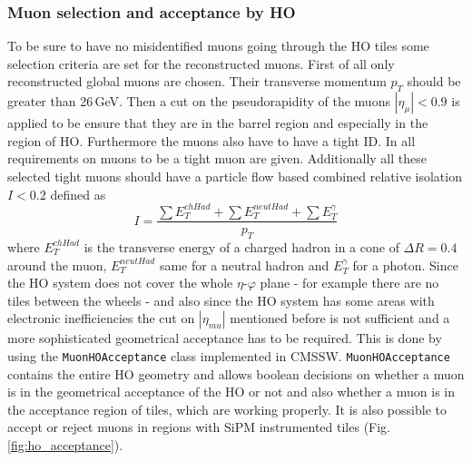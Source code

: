 		\subsubsection{Muon selection and acceptance by HO}
		\label{thesectionhere}
			To be sure to have no misidentified muons going through the HO tiles some selection criteria are set for the reconstructed muons.
			First of all only reconstructed global muons are chosen.
			Their transverse momentum $p_T$ should be greater than 26\,GeV.
			Then a cut on the pseudorapidity of the muons $|\eta_\mu| < 0.9$ is applied to be ensure that they are in the barrel region and especially in the region of HO.
			Furthermore the muons also have to have a tight ID.
			In \cite{CMS-PAPER-MUO-10-004} all requirements on muons to be a tight muon are given.
			Additionally all these selected tight muons should have a particle flow based combined relative isolation $I<0.2$ defined as
			\begin{equation}
				I = \frac{\sum{E_T^{chHad}} + \sum{E_T^{neutHad}} + \sum{E_T^\gamma}}{p_T}
			\end{equation}
			where $E_T^{chHad}$ is the transverse energy of a charged hadron in a cone of $\Delta R = 0.4$ around the muon, $E_T^{neutHad}$ same for a neutral hadron and $E_T^\gamma$ for a photon.
			Since the HO system does not cover the whole $\eta$-$\varphi$ plane - for example there are no tiles between the wheels - and also since the HO system has some areas with electronic inefficiencies the
			cut on $|\eta_{mu}|$ mentioned before is not sufficient and a more sophisticated geometrical acceptance has to be required.
			This is done by using the \verb+MuonHOAcceptance+ class implemented in CMSSW.
			\verb+MuonHOAcceptance+ contains the entire HO geometry and allows boolean decisions on whether a muon is in the geometrical acceptance of the HO or not and also whether a muon is in the
			acceptance region of tiles, which are working properly.
			It is also possible to accept or reject muons in regions with SiPM instrumented tiles (Fig. \ref{fig:ho_acceptance}).
